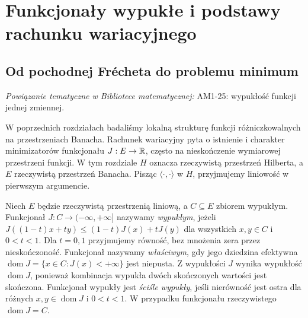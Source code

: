
\section{Funkcjonały wypukłe i podstawy rachunku wariacyjnego}
\label{sec:wariacyjny16}

\providecommand{\atlasref}[2]{#2}


\subsection{Od pochodnej Frécheta do problemu minimum}

\noindent\emph{Powiązanie tematyczne w Bibliotece matematycznej:} \atlasref{AM1-25::ma1:def:convex-function}{AM1-25: wypukłość funkcji jednej zmiennej}.


W poprzednich rozdziałach badaliśmy lokalną strukturę funkcji
różniczkowalnych na przestrzeniach Banacha. Rachunek wariacyjny pyta
o istnienie i charakter minimizatorów funkcjonału $J:E\to\mathbb R$,
często na nieskończenie wymiarowej przestrzeni funkcji.
W tym rozdziale $H$ oznacza rzeczywistą przestrzeń Hilberta,
a $E$ rzeczywistą przestrzeń Banacha. Pisząc $\langle\cdot,\cdot\rangle$
w $H$, przyjmujemy liniowość w pierwszym argumencie.

\begin{definicja}
\label{def:convex-fun16}
Niech $E$ będzie rzeczywistą przestrzenią liniową,
a $C\subseteq E$ zbiorem wypukłym.
Funkcjonał $J:C\to(-\infty,+\infty]$ nazywamy
\emph{wypukłym}, jeżeli
$J((1-t)x+ty)\le(1-t)J(x)+tJ(y)$ dla wszystkich $x,y\in C$
i $0<t<1$. Dla $t=0,1$ przyjmujemy równość, bez
mnożenia zera przez nieskończoność.
Funkcjonał nazywamy \emph{właściwym}, gdy jego dziedzina
efektywna $\operatorname{dom}J=\{x\in C:J(x)<+\infty\}$
jest niepusta. Z wypukłości $J$ wynika wypukłość
$\operatorname{dom}J$, ponieważ kombinacja wypukła
dwóch skończonych wartości jest skończona.
Funkcjonał wypukły jest \emph{ściśle wypukły}, jeśli nierówność
jest ostra dla różnych $x,y\in\operatorname{dom}J$
i $0<t<1$. W przypadku funkcjonału rzeczywistego
$\operatorname{dom}J=C$.
\end{definicja}

